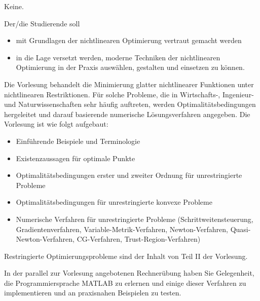 \begin{course}
\begin{styleenv}
\begin{assessment}
\end{assessment}

\begin{conditions}Keine.\end{conditions}


\end{styleenv}

\begin{learningoutcomes}
Der/die Studierende soll

 \begin{itemize}\item mit Grundlagen der nichtlinearen Optimierung vertraut gemacht werden  \item in die Lage versetzt werden, moderne Techniken der nichtlinearen Optimierung in der Praxis auswählen, gestalten und einsetzen zu können.  \end{itemize}
\end{learningoutcomes}

\begin{content}
Die Vorlesung behandelt die Minimierung glatter nichtlinearer Funktionen unter nichtlinearen Restriktionen. Für solche Probleme, die in Wirtschafts-, Ingenieur- und Naturwissenschaften sehr häufig auftreten, werden Optimalitätsbedingungen hergeleitet und darauf basierende numerische Lösungsverfahren angegeben. Die Vorlesung ist wie folgt aufgebaut:

 \begin{itemize}\item Einführende Beispiele und Terminologie  \item Existenzaussagen für optimale Punkte  \item Optimalitätsbedingungen erster und zweiter Ordnung für unrestringierte Probleme  \item Optimalitätsbedingungen für unrestringierte konvexe Probleme  \item Numerische Verfahren für unrestringierte Probleme (Schrittweitensteuerung, Gradientenverfahren, Variable-Metrik-Verfahren, Newton-Verfahren, Quasi-Newton-Verfahren, CG-Verfahren, Trust-Region-Verfahren)  \end{itemize}

Restringierte Optimierungsprobleme sind der Inhalt von Teil II der Vorlesung.

 

In der parallel zur Vorlesung angebotenen Rechnerübung haben Sie Gelegenheit, die Programmiersprache MATLAB zu erlernen und einige dieser Verfahren zu implementieren und an praxisnahen Beispielen zu testen.



\end{content}
\end{course}
